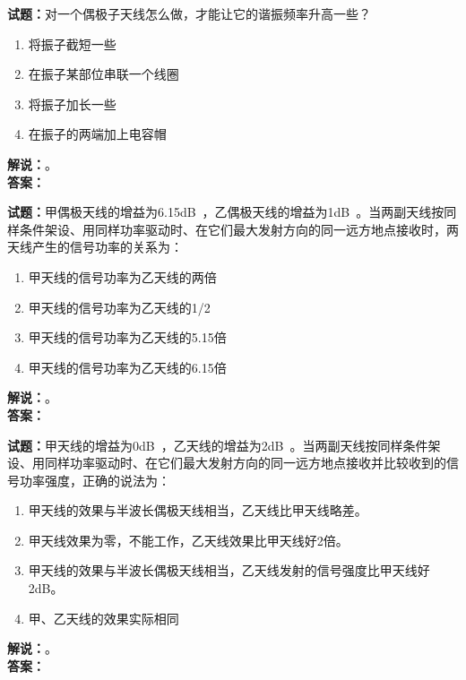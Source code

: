 \documentclass{ctexbook}
\begin{document}
\bigskip




\noindent\textbf{试题：}对一个偶极子天线怎么做，才能让它的谐振频率升高一些？
\begin{enumerate}[leftmargin=3em]
\item 将振子截短一些
\item 在振子某部位串联一个线圈
\item 将振子加长一些
\item 在振子的两端加上电容帽
\end{enumerate}
\noindent\textbf{解说：}\textbf{}。\\\noindent\textbf{答案：}

\bigskip




\noindent\textbf{试题：}甲偶极天线的增益为6.15\unit[qualifier-mode=combine]{\deci\bel{}}，乙偶极天线的增益为1\unit[qualifier-mode=combine]{\deci\bel{}}。当两副天线按同样条件架设、用同样功率驱动时、在它们最大发射方向的同一远方地点接收时，两天线产生的信号功率的关系为：
\begin{enumerate}[leftmargin=3em]
\item 甲天线的信号功率为乙天线的两倍
\item 甲天线的信号功率为乙天线的1/2
\item 甲天线的信号功率为乙天线的5.15倍
\item 甲天线的信号功率为乙天线的6.15倍
\end{enumerate}
\noindent\textbf{解说：}\textbf{}。\\\noindent\textbf{答案：}

\bigskip




\noindent\textbf{试题：}甲天线的增益为0\unit[qualifier-mode=combine]{\deci\bel{}}，乙天线的增益为2\unit[qualifier-mode=combine]{\deci\bel{}}。当两副天线按同样条件架设、用同样功率驱动时、在它们最大发射方向的同一远方地点接收并比较收到的信号功率强度，正确的说法为：
\begin{enumerate}[leftmargin=3em]
\item 甲天线的效果与半波长偶极天线相当，乙天线比甲天线略差。
\item 甲天线效果为零，不能工作，乙天线效果比甲天线好2倍。
\item 甲天线的效果与半波长偶极天线相当，乙天线发射的信号强度比甲天线好2dB。
\item 甲、乙天线的效果实际相同
\end{enumerate}
\noindent\textbf{解说：}\textbf{}。\\\noindent\textbf{答案：}
\end{document}
